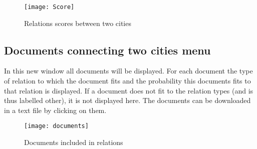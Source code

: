\begin{figure}[H]
    \centering
    \texttt{[image: Score]}
    \caption{Relations scores between two cities}
    \label{fig:infoflow}
\end{figure}


\subsection{Documents connecting two cities menu}
In this new window all documents will be displayed. For each document the type of relation to which the document fits and the probability this documents fits to that relation is displayed. If a document does not fit to the relation types (and is thus labelled other), it is not displayed here. The documents can be downloaded in a text file by clicking on them.

\begin{figure}[H]
    \centering
    \texttt{[image: documents]}
    \caption{Documents included in relations}
    \label{fig:infoflow}
\end{figure}

